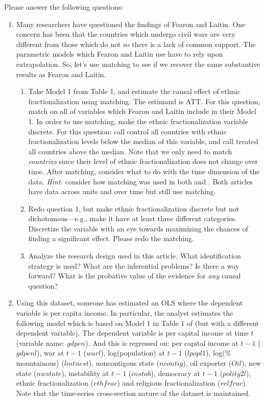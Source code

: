\documentclass[fleqn,titlepage,12pt]{article}
\begin{document}
Please answer the following questions:
\begin{enumerate}
\item Many researchers have questioned the findings of Fearon and
  Laitin.  One concern has been that the countries which undergo civil
  wars are very different from those which do not so there is a lack
  of common support. The parametric models which Fearon and Laitin use
  have to rely upon extrapolation.  So, let's use matching to see if
  we recover the same substantive results as Fearon and Laitin.

  \begin{enumerate}
  \item Take Model 1 from Table 1, and estimate the causal effect of     ethnic fractionalization using matching. The estimand is ATT. For     this question, match on all of variables which Fearon and Laitin     include in their Model 1.  In order to use matching, make the     ethnic fractionalization variable discrete.  For this question:     call control all countries with ethnic fractionalization levels     below the median of this variable, and call treated all countries     above the median.  Note that we only need to match     \textit{countries} since their level of ethnic fractionalization     does not change over time.  After matching, consider what to do     with the time dimension of the data.  \textit{Hint:} consider how     matching was used in both \citet{GordonHuber2007} and     \citet{GalianiGertlerSchargrodsky2005}.  Both articles have
    data across units and over time but still use matching.
    
  \item Redo question 1, but make ethnic fractionalization discrete     but not dichotomous---e.g., make it have at least three different     categories.  Discretize the variable with an eye towards     maximizing the chances of finding a significant effect.  Please     redo the matching.
    
  \item Analyze the research design used in this article. What
    identification strategy is used? What are the inferential
    problems?  Is there a way forward?  What is the probative value of
    the evidence for \textit{any} causal question?
  \end{enumerate}

\item Using this dataset, someone has estimated an OLS where the
  dependent variable is per capita income.  In particular, the analyst
  estimates the following model which is based on Model 1 in Table 1
  of \cite{FearonLaitin2003} (but with a different dependent
  variable).  The dependent variable is per capital income at time $t$
  (variable name: $gdpen$).  And this is regressed on: per capital
  income at $t-1$ ($gdpenl$), war at $t-1$ ($warl$), log(population)
  at $t-1$ ($lpopl1$), log(\% mountainous) ($lmtnest$), noncontigous
  state ($ncontig$), oil exporter ($Oil$), new state ($nwstate$),
  instability at $t-1$ ($instab$), democracy at $t-1$ ($polity2l$),
  ethnic fractionalization ($ethfrac$) and religious fractionalization
  ($relfrac$).  Note that the time-series cross-section nature of the
  dataset is maintained.


\end{enumerate}
\end{document}
